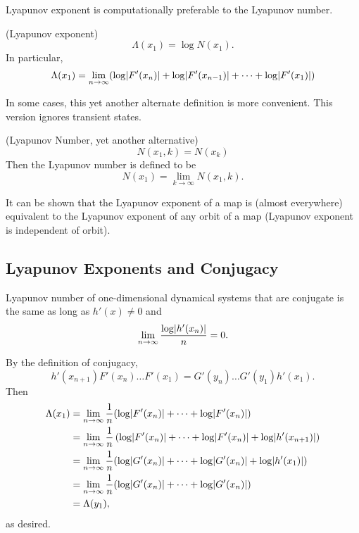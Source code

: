 \documentclass[11pt]{article}
\begin{document}
Lyapunov exponent is computationally preferable to the Lyapunov number.
\begin{definition}
  (Lyapunov exponent)
  \begin{equation*}
    \Lambda(x_1) = \log N(x_1).
  \end{equation*}
  In particular,
  \begin{equation*}
    \Lambda(x_1) = \lim\limits_{n \to \infty} \paren*{\log\abs{F'(x_n)} + \log\abs{F'(x_{n-1})} + \cdots + \log\abs{F'(x_1)}}
  \end{equation*}
\end{definition}

In some cases, this yet another alternate definition is more convenient.
This version ignores transient states.
\begin{definition}
  (Lyapunov Number, yet another alternative)
  \begin{equation*}
    N(x_1, k) = N(x_k)
  \end{equation*}
  Then the Lyapunov number is defined to be
  \begin{equation*}
    N(x_1) = \lim\limits_{k \to \infty} N(x_1,k).
  \end{equation*}
\end{definition}

It can be shown that the Lyapunov exponent of a map is (almost everywhere) equivalent to the Lyapunov exponent of any orbit of a map (Lyapunov exponent is independent of orbit).


\subsection{Lyapunov Exponents and Conjugacy}
Lyapunov number of one-dimensional dynamical systems that are conjugate is the same
as long as $h'(x) \neq 0$ and
\begin{equation*}
  \lim\limits_{n\to \infty} \frac{\log\lvert h'(x_n)\rvert}{n} = 0.
\end{equation*}

By the definition of conjugacy,
\begin{equation*}
  h'(x_{n+1})F'(x_n)\ldots F'(x_1) = G'(y_n)\ldots G'(y_1)h'(x_1).
\end{equation*}
Then 
\begin{align*}
  \Lambda(x_1) &= \lim\limits_{n\to \infty} \frac{1}{n}\paren{\log\abs{F'(x_n)} + \cdots + \log\abs{F'(x_n)} } \\
  &= \lim\limits_{n\to \infty} \frac{1}{n}\left(\log\abs{F'(x_n)} + \cdots + \log\abs{F'(x_n)} + \log\abs{h'(x_{n+1})}\right) \\
  &= \lim\limits_{n\to \infty} \frac{1}{n} \paren*{ \log\abs{G'(x_n)} + \cdots + \log\abs{G'(x_n)} + \log\abs{h'(x_1)} } \\
  &= \lim\limits_{n\to \infty} \frac{1}{n} \paren*{ \log\abs{G'(x_n)} + \cdots + \log\abs{G'(x_n)} } \\
  &= \Lambda(y_1),
\end{align*} 
as desired.
\end{document}
